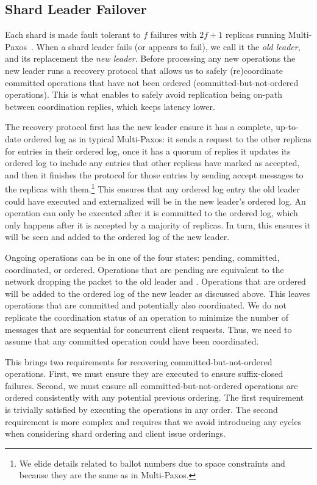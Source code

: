 \subsection{Shard Leader Failover}
\label{subsec:leaderfailures}
Each shard is made fault tolerant to $f$ failures with $2f+1$ replicas running Multi-Paxos~\cite{lamport1998paxos}.
When a shard leader fails (or appears to fail), we call it the \textit{old leader}, and its replacement the \textit{new leader}.
Before processing any new operations the new leader runs a recovery protocol that allows us to safely (re)coordinate committed operations that have not been ordered (committed-but-not-ordered operations).
This is what enables \sys{} to safely avoid replication being on-path between coordination replies, which keeps latency lower.

The recovery protocol first has the new leader ensure it has a complete, up-to-date ordered log as in typical Multi-Paxos:
it sends a request to the other replicas for entries in their ordered log,
once it has a quorum of replies it updates its ordered log to include any entries that other replicas have marked as accepted,
and then it finishes the protocol for those entries by sending accept messages to the replicas with them.\footnote{We elide details related to ballot numbers due to space constraints and because they are the same as in Multi-Paxos.}
This ensures that any ordered log entry the old leader could have executed and externalized will be in the new leader's ordered log.
An operation can only be executed after it is committed to the ordered log,
which only happens after it is accepted by a majority of replicas. In turn, this
ensures it will be seen and added to the ordered log of the new leader.

Ongoing operations can be in one of the four states: pending, committed, coordinated, or ordered.
Operations that are pending are equivalent to the network dropping the packet to the old leader and .
Operations that are ordered will be added to the ordered log of the new leader as discussed above.
This leaves operations that are committed and potentially also coordinated.
We do not replicate the coordination status of an operation to minimize the number of messages that are sequential for concurrent client requests.
Thus, we need to assume that any committed operation could have been coordinated.

This brings two requirements for recovering committed-but-not-ordered operations.
First, we must ensure they are executed to ensure suffix-closed failures.
%
Second, we must ensure all committed-but-not-ordered operations are ordered consistently with any potential previous ordering.
The first requirement is trivially satisfied by executing the operations in any order.
The second requirement is more complex and requires that we avoid introducing any cycles when considering shard ordering and client issue orderings.

